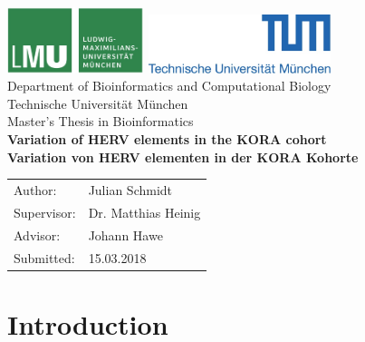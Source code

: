 \documentclass[a4paper,12pt]{article}
\begin{document}
\begin{titlepage}
{\sffamily


\begin{center}
\includegraphics[width=0.3\textwidth]{../figures/LMU-logo.jpg}
\hfill
\includegraphics[width=0.4\textwidth]{../figures/TUM-logo.jpg}  
\\[1.5cm]  

{\LARGE Department of Bioinformatics and Computational Biology}\\[0.5cm]
{Technische Universit\"at M\"unchen}\\[1cm]

{\Large Master's Thesis in Bioinformatics}\\[2cm]
{\textbf{\LARGE Variation of HERV elements in the KORA cohort}}\\[2cm]
{\textbf{\LARGE Variation von HERV elementen in der KORA Kohorte}}\\[4cm]

\end{center}
\begin{center}\Large
  \begin{tabular}{ll}
    Author:& Julian Schmidt\\
    Supervisor: & Dr. Matthias Heinig\\
    Advisor:        & Johann Hawe\\
    Submitted:     &  15.03.2018\\
  \end{tabular}
\end{center}

}%

\end{titlepage}


\tableofcontents
\newpage

\pagestyle{plain}
\section{Introduction}
\end{document}
